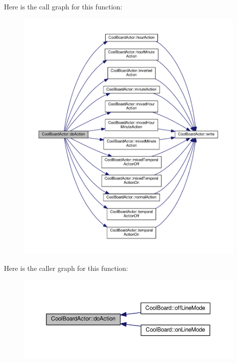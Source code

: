 Here is the call graph for this function\+:\nopagebreak
\begin{figure}[H]
\begin{center}
\leavevmode
\includegraphics[width=350pt]{dc/d69/class_cool_board_actor_a3323ba7aaa4bef3ff084dcd830fe9b61_cgraph}
\end{center}
\end{figure}
Here is the caller graph for this function\+:\nopagebreak
\begin{figure}[H]
\begin{center}
\leavevmode
\includegraphics[width=350pt]{dc/d69/class_cool_board_actor_a3323ba7aaa4bef3ff084dcd830fe9b61_icgraph}
\end{center}
\end{figure}
\mbox{\label{class_cool_board_actor_a81229abf5895f4d3b0355050b822b438}} 
